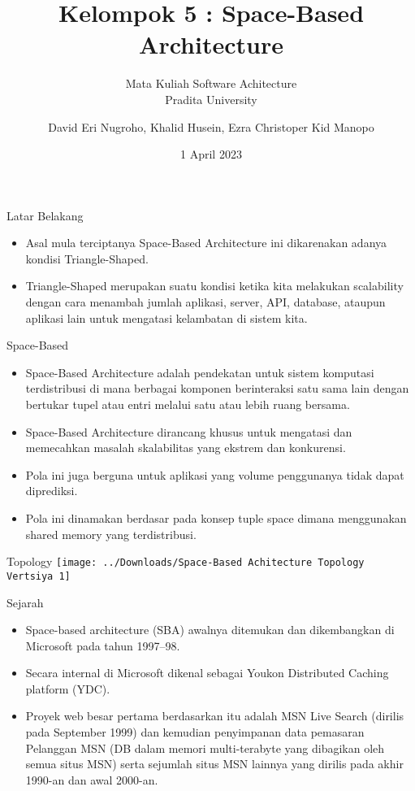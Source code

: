 \documentclass{beamer}
\title{Kelompok 5 : Space-Based Architecture}
\subtitle{Mata Kuliah Software Achitecture\\Pradita University}
\author{David Eri Nugroho, Khalid Husein, Ezra Christoper Kid Manopo}
\date{1 April 2023}
\begin{document}
	
	\begin{frame}[plain]
		\maketitle
	\end{frame}
	
	\begin{frame}{Latar Belakang}
		\begin{itemize}
			\item Asal mula terciptanya Space-Based Architecture ini dikarenakan adanya kondisi Triangle-Shaped.
			\item Triangle-Shaped merupakan suatu kondisi ketika kita melakukan scalability dengan cara menambah jumlah aplikasi, server, API, database, ataupun aplikasi lain untuk mengatasi kelambatan di sistem kita.
		\end{itemize}
	\end{frame}
	
	\begin{frame}{Space-Based}
		\begin{itemize}
			\item Space-Based Architecture adalah pendekatan untuk sistem komputasi terdistribusi di mana berbagai komponen berinteraksi satu sama lain dengan bertukar tupel atau entri melalui satu atau lebih ruang bersama.
			\item Space-Based Architecture dirancang khusus untuk mengatasi dan memecahkan masalah skalabilitas yang ekstrem dan konkurensi.
			\item Pola ini juga berguna untuk aplikasi yang volume penggunanya tidak dapat diprediksi.
			\item Pola ini dinamakan berdasar pada konsep tuple space dimana menggunakan shared memory yang terdistribusi.
		\end{itemize}
	\end{frame}

	\begin{frame}{Topology}
		\centering
		\texttt{[image: ../Downloads/Space-Based Achitecture Topology Vertsiya 1]}
	\end{frame}

	\begin{frame}{Sejarah}
		\begin{itemize}
			\item Space-based architecture (SBA) awalnya ditemukan dan dikembangkan di Microsoft pada tahun 1997–98.
			\item Secara internal di Microsoft dikenal sebagai Youkon Distributed Caching platform (YDC).
			\item Proyek web besar pertama berdasarkan itu adalah MSN Live Search (dirilis pada September 1999) dan kemudian penyimpanan data pemasaran Pelanggan MSN (DB dalam memori multi-terabyte yang dibagikan oleh semua situs MSN) serta sejumlah situs MSN lainnya yang dirilis pada akhir 1990-an dan awal 2000-an.
		\end{itemize}
	\end{frame}
	
\end{document}
